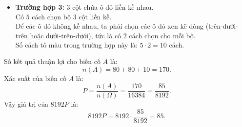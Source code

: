 \begin{ex}
{\begin{itemize}
			\item \textbf{Trường hợp 3:} $3$ cột chứa ô đỏ liền kề nhau. \\
			Có $5$ cách chọn bộ $3$ cột liền kề. \\
			Để các ô đỏ không kề nhau, ta phải chọn các ô đỏ xen kẽ dòng (trên-dưới-trên hoặc dưới-trên-dưới), tức là có $2$ cách chọn cho mỗi bộ. \\
			Số cách tô màu trong trường hợp này là: $5 \cdot 2 = 10$ cách.
		\end{itemize}
		Số kết quả thuận lợi cho biến cố $A$ là:
		$$n\left( A \right) = 80 + 80 + 10 = 170.$$
		Xác suất của biến cố $A$ là:
		$$P = \dfrac{n\left( A \right)}{n\left( \Omega \right)} = \dfrac{170}{16384} = \dfrac{85}{8192}.$$
		Vậy giá trị của $8192P$ là:
		$$8192P = 8192 \cdot \dfrac{85}{8192} = 85.$$
	}
\end{ex}

